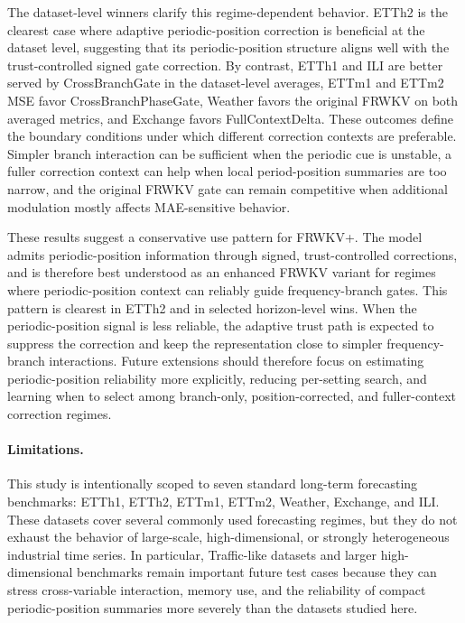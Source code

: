 \documentclass[a4paper,fleqn]{cas-sc}
\begin{document}
The dataset-level winners clarify this regime-dependent behavior. ETTh2 is the clearest case where adaptive periodic-position correction is beneficial at the dataset level, suggesting that its periodic-position structure aligns well with the trust-controlled signed gate correction. By contrast, ETTh1 and ILI are better served by CrossBranchGate in the dataset-level averages, ETTm1 and ETTm2 MSE favor CrossBranchPhaseGate, Weather favors the original FRWKV on both averaged metrics, and Exchange favors FullContextDelta. These outcomes define the boundary conditions under which different correction contexts are preferable. Simpler branch interaction can be sufficient when the periodic cue is unstable, a fuller correction context can help when local period-position summaries are too narrow, and the original FRWKV gate can remain competitive when additional modulation mostly affects MAE-sensitive behavior.

These results suggest a conservative use pattern for FRWKV+. The model admits periodic-position information through signed, trust-controlled corrections, and is therefore best understood as an enhanced FRWKV variant for regimes where periodic-position context can reliably guide frequency-branch gates. This pattern is clearest in ETTh2 and in selected horizon-level wins. When the periodic-position signal is less reliable, the adaptive trust path is expected to suppress the correction and keep the representation close to simpler frequency-branch interactions. Future extensions should therefore focus on estimating periodic-position reliability more explicitly, reducing per-setting search, and learning when to select among branch-only, position-corrected, and fuller-context correction regimes.

\paragraph{Limitations.}
This study is intentionally scoped to seven standard long-term forecasting benchmarks: ETTh1, ETTh2, ETTm1, ETTm2, Weather, Exchange, and ILI. These datasets cover several commonly used forecasting regimes, but they do not exhaust the behavior of large-scale, high-dimensional, or strongly heterogeneous industrial time series. In particular, Traffic-like datasets and larger high-dimensional benchmarks remain important future test cases because they can stress cross-variable interaction, memory use, and the reliability of compact periodic-position summaries more severely than the datasets studied here.
\end{document}
